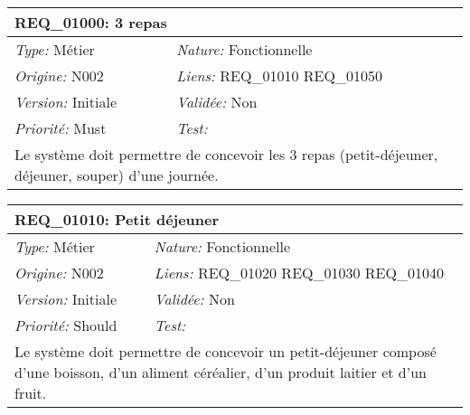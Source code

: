 
\begin{table}[!h]

\begin{tabular}{|p{60mm}p{100mm}|}

\hline

\multicolumn{2}{|l|}{\textbf{REQ\_01000:} 3 repas} \\ \hline

\emph{Type:} Métier & \emph{Nature:} Fonctionnelle \\

\emph{Origine:} N002 & \emph{Liens:} REQ\_01010 REQ\_01050  \\

\emph{Version:} Initiale & \emph{Validée:} Non \\

\emph{Priorité:} Must & \emph{Test:} \\ \hline

\multicolumn{2}{|p{16cm}|}{Le système doit permettre de concevoir les 3 repas (petit-déjeuner, déjeuner, souper) d'une journée.} \\ \hline

\end{tabular}

\end{table}



\begin{table}[!h]

\begin{tabular}{|p{60mm}p{100mm}|}

\hline

\multicolumn{2}{|l|}{\textbf{REQ\_01010:} Petit déjeuner} \\ \hline

\emph{Type:} Métier & \emph{Nature:} Fonctionnelle \\

\emph{Origine:} N002 & \emph{Liens:} REQ\_01020 REQ\_01030 REQ\_01040  \\

\emph{Version:} Initiale & \emph{Validée:} Non \\

\emph{Priorité:} Should & \emph{Test:} \\ \hline

\multicolumn{2}{|p{16cm}|}{Le système doit permettre de concevoir un petit-déjeuner composé d'une boisson, d'un aliment céréalier, d'un produit laitier et d'un fruit.} \\ \hline

\end{tabular}

\end{table}




